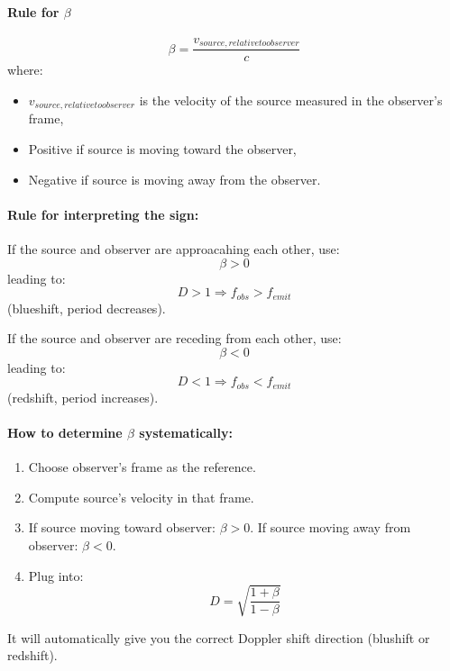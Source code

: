 \documentclass[a4paper]{article}
\theoremstyle{plain}
\theoremstyle{definition}
\begin{document}
\paragraph{Rule for $\beta$}

\begin{equation}
\beta = \frac{v_{source,relative to observer}}{c}
\end{equation}
where:
\begin{itemize}
\item $v_{source,relative to observer}$ is the velocity of the source measured in the observer's frame,
\item Positive if source is moving toward the observer,
\item Negative if source is moving away from the observer.
\end{itemize}

\paragraph{Rule for interpreting the sign:}

If the source and observer are approacahing each other, use:
\begin{equation}
\beta > 0
\end{equation}
leading to:
\begin{equation}
D > 1 \Rightarrow f_{obs} > f_{emit}
\end{equation}
(blueshift, period decreases).

If the source and observer are receding from each other, use:
\begin{equation}
\beta < 0
\end{equation}
leading to:
\begin{equation}
D < 1 \Rightarrow f_{obs} < f_{emit}
\end{equation}
(redshift, period increases).

\paragraph{How to determine $\beta$ systematically:}

\begin{enumerate}
\item Choose observer's frame as the reference.
\item Compute source's velocity in that frame.
\item If source moving toward observer: $\beta > 0$.  If source moving away from observer: $\beta < 0$.
\item Plug into:
\begin{equation}
D = \sqrt{ \frac{1+\beta}{1-\beta} }
\end{equation}
\end{enumerate}

It will automatically give you the correct Doppler shift direction
(blushift or redshift).
\end{document}
